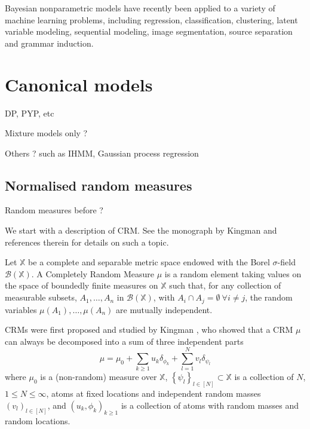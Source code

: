 Bayesian nonparametric models have recently been applied to a variety of machine learning problems, including regression, classification, clustering, latent variable modeling, sequential modeling, image segmentation, source separation and grammar induction.

\section{Canonical models}
DP, PYP, etc

Mixture models only ?

Others ? such as IHMM, Gaussian process regression

\subsection{Normalised random measures}
Random measures before ?

We start with a description of \gls{CRM}.
See the monograph by Kingman \cite{kingman-poisson-processes} and references therein for details on such a topic. \\

\begin{definition} \label{def:CRM}
Let $\mathbb{X}$ be a complete and separable metric space endowed with the Borel $\sigma$-field $\mathcal{B}(\mathbb{X})$. A Completely Random Measure $\mu$ is a random element taking values on the space of boundedly finite measures on $\mathbb{X}$ such that, for any collection of measurable subsets, $A_1, \dots , A_n$ in $\mathcal{B}(\mathbb{X})$, with $A_i \cap  A_j = \emptyset \ \forall i \neq j$, the random variables $\mu(A_1), \dots, \mu(A_n)$ are mutually independent.
\end{definition}

\gls{CRM}s were first proposed and studied by Kingman \cite{Kingman:1967kn}, who showed that a \gls{CRM} $\mu$ can always be decomposed into a sum of three independent parts
$$ \mu = \mu_0 + \sum_{k \ge 1}{u_k \delta_{\phi_k}} + \sum_{l=1}^N{v_l \delta_{\psi_l}} $$
where $\mu_0$ is a (non-random) measure over $\mathbb{X}$, $\left\{ \psi_l \right\}_{l \in [N]} \subset  \mathbb{X}$ is a collection of $N$, $1 \le N \le \infty$, atoms at fixed locations and independent random masses $\left(v_l \right)_{l \in [N]}$, and $\left( u_k, \phi_k \right)_{k \ge 1}$ is a collection of atoms with random masses and random locations.

